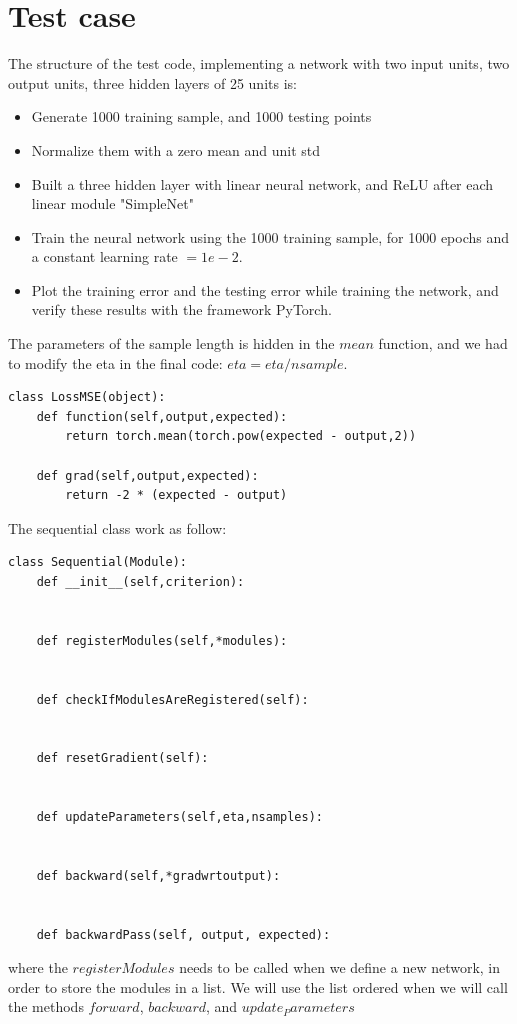 \documentclass[10pt,final,a4paper]{article}
\begin{document}
\section{Test case}
The structure of the test code, implementing a network with two input units, two output units, three hidden layers of 25 units is:
\begin{itemize}
\item Generate 1000 training sample, and 1000 testing points\\
\item Normalize them with a zero mean and unit std\\
\item Built a three hidden layer with linear neural network, and ReLU after each linear module "SimpleNet"\\
\item Train the neural network using the 1000 training sample, for 1000 epochs and a constant learning rate $=1e-2$.
\item Plot the training error and the testing error while training the network, and verify these results with the framework PyTorch.
\end{itemize}

The parameters of the sample length is hidden in the $mean$ function, and we had to modify the eta in the final code: $eta=eta/nsample$.
\begin{verbatim}
class LossMSE(object):
    def function(self,output,expected):
        return torch.mean(torch.pow(expected - output,2))

    def grad(self,output,expected):
        return -2 * (expected - output)
\end{verbatim}

The sequential class work as follow:
\begin{verbatim}
class Sequential(Module):
    def __init__(self,criterion):


    def registerModules(self,*modules):


    def checkIfModulesAreRegistered(self):


    def resetGradient(self):


    def updateParameters(self,eta,nsamples):


    def backward(self,*gradwrtoutput):


    def backwardPass(self, output, expected):

\end{verbatim}
where the $registerModules$ needs to be called when we define a new network, in order to store the modules in a list. We will use the list ordered when we will call the methods $forward$, $backward$, and $update_Parameters$

 
\end{document}
